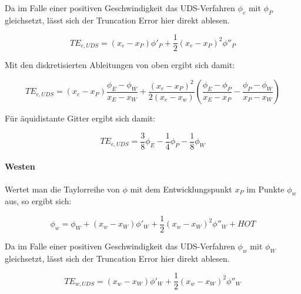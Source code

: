 \documentclass[11pt, ngerman,colorback,accentcolor=tud2d]{tudreport}
\begin{document}
Da im Falle einer positiven Geschwindigkeit das UDS-Verfahren $\phi_e$ mit $\phi_P$
gleichsetzt, lässt sich der Truncation Error hier direkt ablesen.

\begin{equation*}
  TE_{e, UDS} = (x_e-x_P) \phi'_P + \frac{1}{2} (x_e-x_P)^2 \phi''_P
\end{equation*}

Mit den diskretisierten Ableitungen von oben ergibt sich damit:

\begin{equation}
  TE_{e, UDS} = (x_e-x_P) \frac{\phi_E-\phi_W}{x_E-x_W}+
  \frac{(x_e-x_P)^2}{2(x_e-x_w)} \left({\frac{\phi_E-\phi_P}{x_E-x_P}
  - \frac{\phi_P-\phi_W}{x_P-x_W} }\right)
\end{equation}

Für äquidistante Gitter ergibt sich damit:

\begin{equation}
  TE_{e, UDS} = \frac{3}{8} \phi_E-\frac{1}{4} \phi_P - \frac{1}{8} \phi_W
\end{equation}


\paragraph{Westen}

Wertet man die Taylorreihe von $\phi$ mit dem Entwicklungspunkt $x_P$ im Punkte $\phi_w$
aus, so ergibt sich:

\begin{equation*}
  \phi_w = \phi_W +(x_w-x_W) \phi'_W + \frac{1}{2} (x_w-x_W)^2 \phi''_W+HOT
\end{equation*}

Da im Falle einer positiven Geschwindigkeit das UDS-Verfahren $\phi_w$ mit $\phi_W$
gleichsetzt, lässt sich der Truncation Error hier direkt ablesen.

\begin{equation*}
  TE_{w, UDS} = (x_w-x_W) \phi'_W + \frac{1}{2} (x_w-x_W)^2 \phi''_W
\end{equation*}


\end{document}
